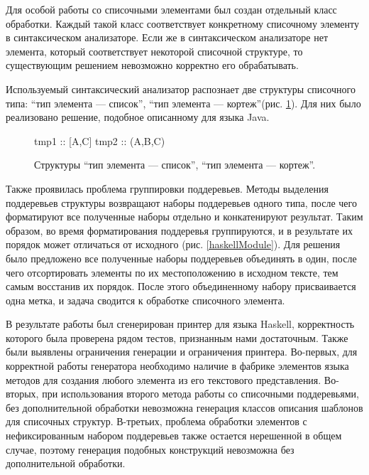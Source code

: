 \documentclass{matmex-diploma}
\begin{document}
Для особой работы со списочными элементами был создан отдельный класс обработки. Каждый такой класс соответствует конкретному списочному элементу в синтаксическом анализаторе. Если же в синтаксическом анализаторе нет элемента, который соответствует некоторой списочной структуре, то существующим решением невозможно корректно его обрабатывать. 

Используемый синтаксический анализатор распознает две структуры списочного типа: “тип элемента --- список”, “тип элемента --- кортеж”(рис. \ref{haskellTypes}). Для них было реализовано решение, подобное описанному для языка Java.

\begin{figure}[H]
    \begin{pyglist}[language=haskell,numbers=left,numbersep=5pt]
    tmp1 :: [A,C]
    tmp2 :: (A,B,C)
    \end{pyglist}
\caption{Структуры “тип элемента --- список”, “тип элемента --- кортеж”.}   
\label{haskellTypes}
\end{figure}

Также проявилась проблема группировки поддеревьев. Методы выделения поддеревьев структуры возвращают наборы поддеревьев одного типа, после чего форматируют все полученные наборы отдельно и конкатенируют результат. Таким образом, во время форматирования поддеревья группируются, и в результате их порядок может отличаться от исходного (рис. \ref{haskellModule}). Для решения было предложено все полученные наборы поддеревьев объединять в один, после чего отсортировать элементы по их местоположению в исходном тексте, тем самым восстанив их порядок. После этого объединенному набору присваивается одна метка, и задача сводится к обработке списочного элемента. 

В результате работы был сгенерирован принтер для языка Haskell, корректность которого была проверена рядом тестов, признанным нами достаточным. Также были выявлены ограничения генерации и ограничения принтера. Во-первых, для корректной работы генератора необходимо наличие в фабрике элементов языка методов для создания любого элемента из его текстового представления. Во-вторых, при использования второго метода работы со списочными поддеревьями, без дополнительной обработки невозможна генерация классов описания шаблонов для списочных структур. В-третьих, проблема обработки элементов с нефиксированным набором поддеревьев также остается нерешенной в общем случае, поэтому генерация подобных конструкций невозможна без дополнительной обработки.
\end{document}

